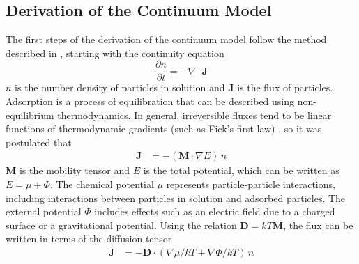 \subsection{Derivation of the Continuum Model }

The first steps of the derivation of the continuum model follow the
method described in \cite{Adamczyk1999,Adamczyk2000,Adamczyk1999a},
starting with the continuity equation\begin{equation}
\frac{\partial n}{\partial t}=-\nabla\cdot\mathbf{J}\label{eq:Continuity}\end{equation}
$n$ is the number density of particles in solution and $\mathbf{J}$
is the flux of particles. Adsorption is a process of equilibration
that can be described using non-equilibrium thermodynamics. In general,
irreversible fluxes tend to be linear functions of thermodynamic gradients
(such as Fick's first law) \cite{degroot1984non}, so it was postulated
that \begin{align}
\mathbf{J} & =-\left(\mathbf{M}\cdot\nabla E\right)\, n\label{eq:Flux ito Mobility}\end{align}
$\mathbf{M}$ is the mobility tensor and $E$ is the total potential,
which can be written as $E=\mu+\Phi$. The chemical potential $\mu$
represents particle-particle interactions, including interactions
between particles in solution and adsorbed particles. The external
potential $\Phi$ includes effects such as an electric field due to
a charged surface or a gravitational potential. Using the relation
$\mathbf{D}=kT\mathbf{M}$, the flux can be written in terms of the
diffusion tensor\begin{align}
\mathbf{J} & =-\mathbf{D}\cdot\left(\nabla\mu/kT+\nabla\Phi/kT\right)\, n\label{eq:Flux ito Diffusion}\end{align}


